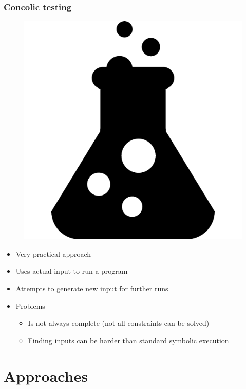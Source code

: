 \documentclass{beamer}
\begin{document}
	\begin{frame}
		\frametitle{Concolic testing}
		
		\begin{figure}[htbp]
			\centering
			\includegraphics[scale=0.1]{concolic}
		\end{figure}
		
		\begin{itemize}
			\item Very practical approach
			\item Uses actual input to run a program
			\item Attempts to generate new input for further runs
			\item Problems
			\begin{itemize}
				\item Is not always complete (not all constraints can be solved)
				\item Finding inputs can be harder than standard symbolic execution
			\end{itemize}
		\end{itemize}
	\end{frame}
	
	\section{Approaches}
	
\end{document}
